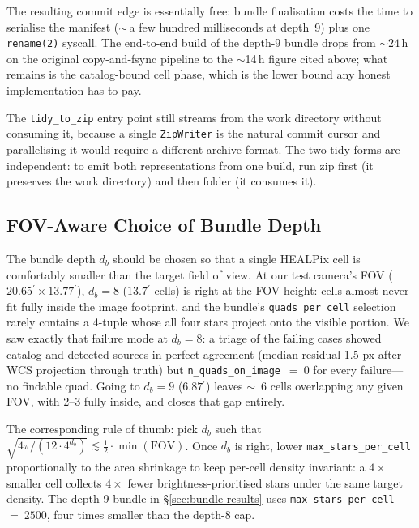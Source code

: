 \documentclass[twocolumn, 10pt]{article}
\newcommand{\arcmin}{\ensuremath{^{\prime}}}
\begin{document}
The resulting commit edge is essentially free: bundle finalisation
costs the time to serialise the manifest ($\sim$\,a few hundred
milliseconds at depth~9) plus one \texttt{rename(2)} syscall. The
end-to-end build of the depth-9 bundle drops from ${\sim}24$\,h on
the original copy-and-fsync pipeline to the $\sim$14\,h figure cited
above; what remains is the catalog-bound cell phase, which is the
lower bound any honest implementation has to pay.

The \texttt{tidy\_to\_zip} entry point still streams from the work
directory without consuming it, because a single \texttt{ZipWriter}
is the natural commit cursor and parallelising it would require a
different archive format. The two tidy forms are independent: to
emit both representations from one build, run zip first (it
preserves the work directory) and then folder (it consumes it).

\subsection{FOV-Aware Choice of Bundle Depth} \label{sec:fov-aware}

The bundle depth $d_b$ should be chosen so that a single HEALPix cell
is comfortably smaller than the target field of view. At our test
camera's FOV ($20.65\arcmin \times 13.77\arcmin$), $d_b = 8$
($13.7\arcmin$ cells) is right at the FOV height: cells almost never
fit fully inside the image footprint, and the bundle's
\texttt{quads\_per\_cell} selection rarely contains a 4-tuple whose
all four stars project onto the visible portion. We saw exactly that
failure mode at $d_b = 8$: a triage of the failing cases showed
catalog and detected sources in perfect agreement (median residual
1.5 px after WCS projection through truth) but
\texttt{n\_quads\_on\_image}~$=~0$ for every failure---no findable
quad. Going to $d_b = 9$ ($6.87\arcmin$) leaves $\sim$~6 cells
overlapping any given FOV, with 2--3 fully inside, and closes that
gap entirely.

The corresponding rule of thumb: pick $d_b$ such that
$\sqrt{4\pi/(12 \cdot 4^{d_b})} \lesssim \tfrac{1}{2} \cdot
\min(\text{FOV})$. Once $d_b$ is right, lower
\texttt{max\_stars\_per\_cell} proportionally to the area shrinkage
to keep per-cell density invariant: a $4\times$ smaller cell
collects $4\times$ fewer brightness-prioritised stars under the same
target density. The depth-9 bundle in §\ref{sec:bundle-results} uses
\texttt{max\_stars\_per\_cell}~$=~2500$, four times smaller than
the depth-8 cap.
\end{document}
